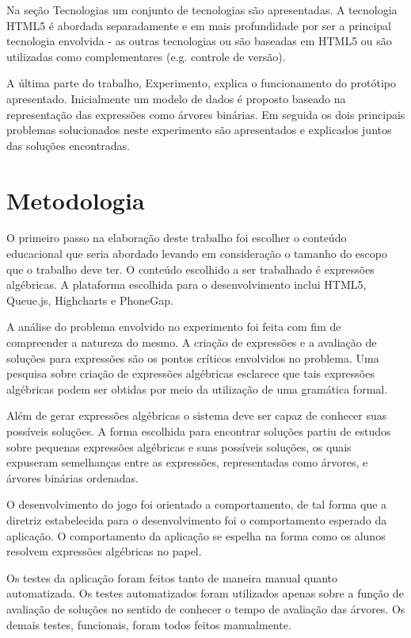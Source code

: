 Na seção Tecnologias um conjunto de tecnologias são apresentadas. A tecnologia HTML5 é abordada separadamente e em mais profundidade por ser a principal tecnologia envolvida - as outras tecnologias ou são baseadas em HTML5 ou são utilizadas como complementares (e.g. controle de versão).

A última parte do trabalho, Experimento, explica o funcionamento do protótipo apresentado. Inicialmente um modelo de dados é proposto baseado na representação das expressões como árvores binárias. Em seguida os dois principais problemas solucionados neste experimento são apresentados e explicados juntos das soluções encontradas.
		
\section{Metodologia}
O primeiro passo na elaboração deste trabalho foi escolher o conteúdo educacional que seria abordado levando em consideração o tamanho do escopo que o trabalho deve ter. O conteúdo escolhido a ser trabalhado é expressões algébricas. A plataforma escolhida para o desenvolvimento inclui HTML5, Queue.js, Highcharts e PhoneGap.
	
	A análise do problema envolvido no experimento foi feita com fim de compreender a natureza do mesmo. A criação de expressões e a avaliação de soluções para expressões são os pontos críticos envolvidos no problema. Uma pesquisa sobre criação de expressões algébricas esclarece que tais expressões algébricas podem ser obtidas por meio da utilização de uma gramática formal.
	
	Além de gerar expressões algébricas o sistema deve ser capaz de conhecer suas possíveis soluções. A forma escolhida para encontrar soluções partiu de estudos sobre pequenas expressões algébricas e suas possíveis soluções, os quais expuseram semelhanças entre as expressões, representadas como árvores, e árvores binárias ordenadas.
	
	O desenvolvimento do jogo foi orientado a comportamento, de tal forma que a diretriz estabelecida para o desenvolvimento foi o comportamento esperado da aplicação. O comportamento da aplicação se espelha na forma como os alunos resolvem expressões algébricas no papel.
	
	Os testes da aplicação foram feitos tanto de maneira manual quanto automatizada. Os testes automatizados foram utilizados apenas sobre a função de avaliação de soluções no sentido de conhecer o tempo de avaliação das árvores. Os demais testes, funcionais, foram todos feitos manualmente.
